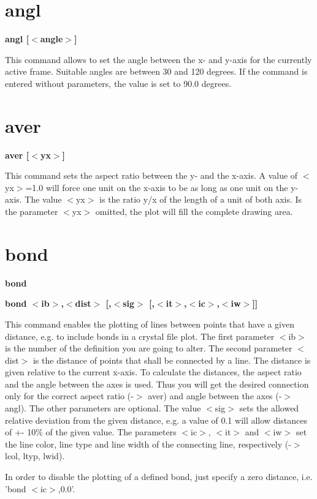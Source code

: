 \section{angl}
{\bf angl [$ <$angle$> $] \par }
\par
\vspace{3pt}
This command allows to set the angle between the x- and y-axis for 
the currently active frame. Suitable angles are between 30 and 120 
degrees. If the command is entered without parameters, the value 
is set to 90.0 degrees. 
\section{aver}
{\bf aver [$ <$yx$> $] \par }
\par
\vspace{3pt}
This command sets the aspect ratio between the y- and the x-axis. 
A value of $ <$yx$> $=1.0 will force one unit on the x-axis to be as 
long as one unit on the y-axis. The value $ <$yx$> $ is the ratio 
y/x of the length of a unit of both axis. Is the parameter $ <$yx$> $ 
omitted, the plot will fill the complete drawing area. 
\section{bond}
{\bf bond \par }
{\bf bond $ <$ib$> $,$ <$dist$> $ [,$ <$sig$> $ [,$ <$it$> $,$ <$ic$> $,$ <$iw$> $]] \par }
\par
\vspace{3pt}
This command enables the plotting of lines between points that 
have a given distance, e.g. to include bonds in a crystal file 
plot. The first parameter $ <$ib$> $ is the number of the definition 
you are going to alter. The second parameter $ <$dist$> $ is the 
distance of points that shall be connected by a line. The distance 
is given relative to the current x-axis. To calculate the distances, 
the aspect ratio and the angle between the axes is used. Thus you 
will get the desired connection only for the correct aspect ratio 
(-$> $ aver) and angle between the axes (-$> $ angl). The other parameters 
are optional. The value $ <$sig$> $ sets the allowed relative deviation 
from the given distance, e.g. a value of 0.1 will allow distances 
of +- 10\% of the given value. The parameters $ <$ic$> $, $ <$it$> $ and $ <$iw$> $ 
set the line color, line type and line width of the connecting 
line, respectively (-$> $ lcol, ltyp, lwid). 
\par
In order to disable the plotting of a defined bond, just specify 
a zero distance, i.e. 'bond $ <$ic$> $,0.0'. 
